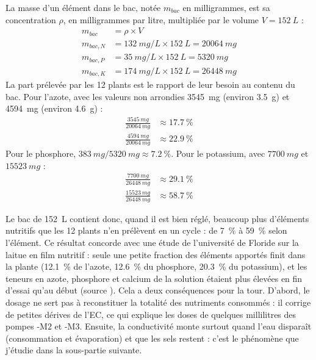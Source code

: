 \begin{demonstration}
La masse d'un élément dans le bac, notée $m_{bac}$ en milligrammes, est sa concentration $\rho$, en milligrammes par litre, multipliée par le volume $V = \qty{152}{L}$ :
\begin{align*}
m_{bac} &= \rho\times V\\
m_{bac,N} &= \qty{132}{mg/L}\times\qty{152}{L} = \qty{20064}{mg}\\
m_{bac,P} &= \qty{35}{mg/L}\times\qty{152}{L} = \qty{5320}{mg}\\
m_{bac,K} &= \qty{174}{mg/L}\times\qty{152}{L} = \qty{26448}{mg}
\end{align*}
La part prélevée par les 12 plants est le rapport de leur besoin au contenu du bac. Pour l'azote, avec les valeurs non arrondies \qty{3545}{mg} (environ \qty{3,5}{g}) et \qty{4594}{mg} (environ \qty{4,6}{g}) :
\begin{align*}
\frac{\qty{3545}{mg}}{\qty{20064}{mg}} &\approx \qty{17,7}{\percent}\\
\frac{\qty{4594}{mg}}{\qty{20064}{mg}} &\approx \qty{22,9}{\percent}
\end{align*}
Pour le phosphore, $\qty{383}{mg}/\qty{5320}{mg} \approx \qty{7,2}{\percent}$. Pour le potassium, avec $\qty{7700}{mg}$ et $\qty{15523}{mg}$ :
\begin{align*}
\frac{\qty{7700}{mg}}{\qty{26448}{mg}} &\approx \qty{29,1}{\percent}\\
\frac{\qty{15523}{mg}}{\qty{26448}{mg}} &\approx \qty{58,7}{\percent}
\end{align*}
\end{demonstration}

Le bac de \qty{152}{L} contient donc, quand il est bien réglé, beaucoup plus d'éléments nutritifs que les 12 plants n'en prélèvent en un cycle : de \qty{7}{\percent} à \qty{59}{\percent} selon l'élément. Ce résultat concorde avec une étude de l'université de Floride sur la laitue en film nutritif : seule une petite fraction des éléments apportés finit dans la plante (\qty{12,1}{\percent} de l'azote, \qty{12,6}{\percent} du phosphore, \qty{20,3}{\percent} du potassium), et les teneurs en azote, phosphore et calcium de la solution étaient plus élevées en fin d'essai qu'au début (source ). Cela a deux conséquences pour la tour. D'abord, le dosage ne sert pas à reconstituer la totalité des nutriments consommés : il corrige de petites dérives de l'EC, ce qui explique les doses de quelques millilitres des pompes -M2 et -M3. Ensuite, la conductivité monte surtout quand l'eau disparaît (consommation et évaporation) et que les sels restent : c'est le phénomène que j'étudie dans la sous-partie suivante.

